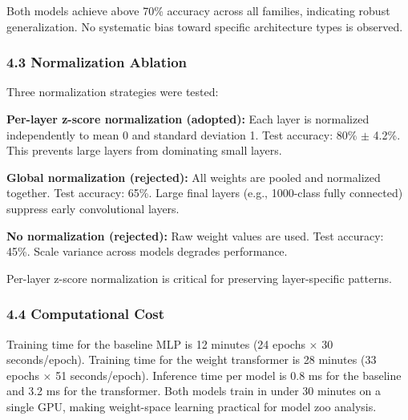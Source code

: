 Both models achieve above 70\% accuracy across all families, indicating robust generalization. No systematic bias toward specific architecture types is observed.

\subsubsection{4.3 Normalization Ablation}

Three normalization strategies were tested:

\textbf{Per-layer z-score normalization (adopted):} Each layer is normalized independently to mean 0 and standard deviation 1. Test accuracy: 80\% $\pm$ 4.2\%. This prevents large layers from dominating small layers.

\textbf{Global normalization (rejected):} All weights are pooled and normalized together. Test accuracy: 65\%. Large final layers (e.g., 1000-class fully connected) suppress early convolutional layers.

\textbf{No normalization (rejected):} Raw weight values are used. Test accuracy: 45\%. Scale variance across models degrades performance.

Per-layer z-score normalization is critical for preserving layer-specific patterns.

\subsubsection{4.4 Computational Cost}

Training time for the baseline MLP is 12 minutes (24 epochs $\times$ 30 seconds/epoch). Training time for the weight transformer is 28 minutes (33 epochs $\times$ 51 seconds/epoch). Inference time per model is 0.8 ms for the baseline and 3.2 ms for the transformer. Both models train in under 30 minutes on a single GPU, making weight-space learning practical for model zoo analysis.
